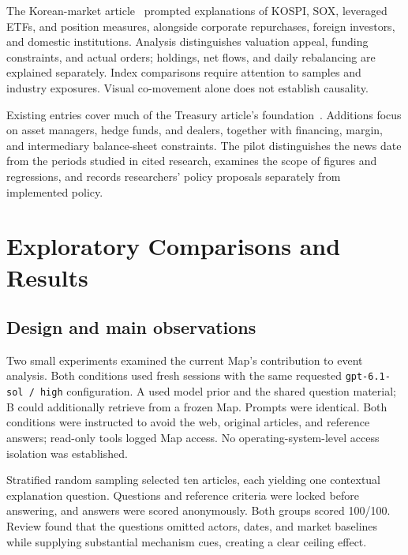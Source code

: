 \documentclass[11pt,letterpaper]{article}
\begin{document}
The Korean-market article~\cite{korea} prompted explanations of KOSPI, SOX, leveraged ETFs, and position measures, alongside corporate repurchases, foreign investors, and domestic institutions. Analysis distinguishes valuation appeal, funding constraints, and actual orders; holdings, net flows, and daily rebalancing are explained separately. Index comparisons require attention to samples and industry exposures. Visual co-movement alone does not establish causality.

Existing entries cover much of the Treasury article's foundation~\cite{basis}. Additions focus on asset managers, hedge funds, and dealers, together with financing, margin, and intermediary balance-sheet constraints. The pilot distinguishes the news date from the periods studied in cited research, examines the scope of figures and regressions, and records researchers' policy proposals separately from implemented policy.

\newpage
\section{Exploratory Comparisons and Results}

\subsection{Design and main observations}

Two small experiments examined the current Map's contribution to event analysis. Both conditions used fresh sessions with the same requested \texttt{gpt-6.1-sol / high} configuration. A used model prior and the shared question material; B could additionally retrieve from a frozen Map. Prompts were identical. Both conditions were instructed to avoid the web, original articles, and reference answers; read-only tools logged Map access. No operating-system-level access isolation was established.

Stratified random sampling selected ten articles, each yielding one contextual explanation question. Questions and reference criteria were locked before answering, and answers were scored anonymously. Both groups scored 100/100. Review found that the questions omitted actors, dates, and market baselines while supplying substantial mechanism cues, creating a clear ceiling effect.
\end{document}
